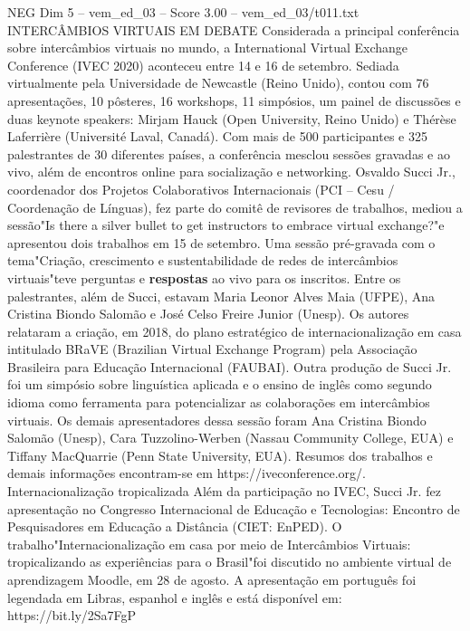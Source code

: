 \begin{textsample}{NEG Dim 5 – vem\_ed\_03 – Score 3.00 – vem\_ed\_03/t011.txt}  \label{ex:f5_neg_111}
INTERCÂMBIOS VIRTUAIS EM DEBATE Considerada a principal conferência sobre intercâmbios virtuais no mundo, a International Virtual Exchange Conference (IVEC 2020) aconteceu entre 14 e 16 de setembro.
Sediada virtualmente pela Universidade de Newcastle (Reino Unido), contou com 76 apresentações, 10 pôsteres, 16 workshops, 11 simpósios, um painel de discussões e duas keynote speakers: Mirjam Hauck (Open University, Reino Unido) e Thérèse Laferrière (Université Laval, Canadá).
Com mais de 500 participantes e 325 palestrantes de 30 diferentes países, a conferência mesclou sessões gravadas e ao vivo, além de encontros online para socialização e networking.
Osvaldo Succi Jr., coordenador dos Projetos Colaborativos Internacionais (PCI – Cesu / Coordenação de Línguas), fez parte do comitê de revisores de trabalhos, mediou a sessão"Is there a silver bullet to get instructors to embrace virtual exchange?"e apresentou dois trabalhos em 15 de setembro.
Uma sessão pré-gravada com o tema"Criação, crescimento e sustentabilidade de redes de intercâmbios virtuais"teve perguntas e \textbf{respostas} ao vivo para os inscritos.
Entre os palestrantes, além de Succi, estavam Maria Leonor Alves Maia (UFPE), Ana Cristina Biondo Salomão e José Celso Freire Junior (Unesp).
Os autores relataram a criação, em 2018, do plano estratégico de internacionalização em casa intitulado BRaVE (Brazilian Virtual Exchange Program) pela Associação Brasileira para Educação Internacional (FAUBAI).
Outra produção de Succi Jr. foi um simpósio sobre linguística aplicada e o ensino de inglês como segundo idioma como ferramenta para potencializar as colaborações em intercâmbios virtuais.
Os demais apresentadores dessa sessão foram Ana Cristina Biondo Salomão (Unesp), Cara Tuzzolino-Werben (Nassau Community College, EUA) e Tiffany MacQuarrie (Penn State University, EUA).
Resumos dos trabalhos e demais informações encontram-se em https://iveconference.org/.
Internacionalização tropicalizada Além da participação no IVEC, Succi Jr. fez apresentação no Congresso Internacional de Educação e Tecnologias: Encontro de Pesquisadores em Educação a Distância (CIET: EnPED).
O trabalho"Internacionalização em casa por meio de Intercâmbios Virtuais: tropicalizando as experiências para o Brasil"foi discutido no ambiente virtual de aprendizagem Moodle, em 28 de agosto.
A apresentação em português foi legendada em Libras, espanhol e inglês e está disponível em: https://bit.ly/2Sa7FgP

\end{textsample}
